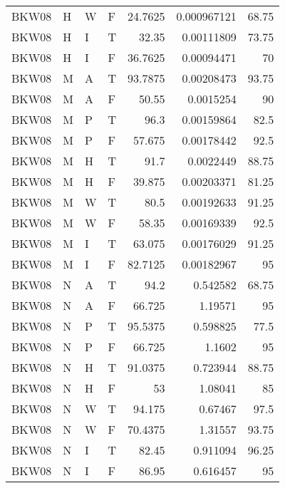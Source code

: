 \begin{table}[htb!]
{\begin{tabular}{llllrrr}
            BKW08    & H     & W     & F          & 24.7625    & 0.000967121 & 68.75    \\
            BKW08    & H     & I     & T          & 32.35      & 0.00111809  & 73.75    \\
            BKW08    & H     & I     & F          & 36.7625    & 0.00094471  & 70       \\
            BKW08    & M     & A     & T          & 93.7875    & 0.00208473  & 93.75    \\
            BKW08    & M     & A     & F          & 50.55      & 0.0015254   & 90       \\
            BKW08    & M     & P     & T          & 96.3       & 0.00159864  & 82.5     \\
            BKW08    & M     & P     & F          & 57.675     & 0.00178442  & 92.5     \\
            BKW08    & M     & H     & T          & 91.7       & 0.0022449   & 88.75    \\
            BKW08    & M     & H     & F          & 39.875     & 0.00203371  & 81.25    \\
            BKW08    & M     & W     & T          & 80.5       & 0.00192633  & 91.25    \\
            BKW08    & M     & W     & F          & 58.35      & 0.00169339  & 92.5     \\
            BKW08    & M     & I     & T          & 63.075     & 0.00176029  & 91.25    \\
            BKW08    & M     & I     & F          & 82.7125    & 0.00182967  & 95       \\
            BKW08    & N     & A     & T          & 94.2       & 0.542582    & 68.75    \\
            BKW08    & N     & A     & F          & 66.725     & 1.19571     & 95       \\
            BKW08    & N     & P     & T          & 95.5375    & 0.598825    & 77.5     \\
            BKW08    & N     & P     & F          & 66.725     & 1.1602      & 95       \\
            BKW08    & N     & H     & T          & 91.0375    & 0.723944    & 88.75    \\
            BKW08    & N     & H     & F          & 53         & 1.08041     & 85       \\
            BKW08    & N     & W     & T          & 94.175     & 0.67467     & 97.5     \\
            BKW08    & N     & W     & F          & 70.4375    & 1.31557     & 93.75    \\
            BKW08    & N     & I     & T          & 82.45      & 0.911094    & 96.25    \\
            BKW08    & N     & I     & F          & 86.95      & 0.616457    & 95       \\
            \hline
        \end{tabular}
    }{
    }
\end{table} 
